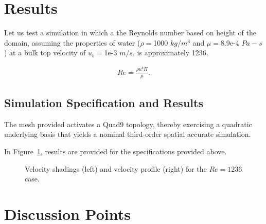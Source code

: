 \documentclass{article}
\begin{document}
\section{Results}


Let us test a simulation in which a the Reynolds number based on height of the domain,
assuming the properties of water ($\rho = $1000 $kg/m^3$ and $\mu = $8.9e-4 $Pa-s$)
at a bulk top velocity of $u_b = $1e-3 $m/s$, is approximately 1236.

\begin{align}
  Re = \frac{\rho u^b H}{\mu}.
\label{eq:muForm}
\end{align}

\subsection{Simulation Specification and Results}

The mesh provided activates a Quad9 topology, thereby exercising a
quadratic underlying basis that yields a nominal third-order spatial accurate
simulation.

In Figure~\ref{fig:results}, results are provided for the specifications
provided above.

\begin{figure}[!htbp]
  \centering
  \centering
  \caption{Velocity shadings (left) and velocity profile (right) for the $Re = 1236$ case.}
  \label{fig:results}
\end{figure}

\section{Discussion Points}
\end{document}
